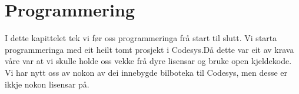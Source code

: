 \chapter{Programmering}
\thispagestyle{fancy}
I dette kapittelet tek vi før oss programmeringa frå start til slutt.
Vi starta programmeringa med eit heilt tomt prosjekt i \gls{Codesys}.Då dette var eit av krava våre var at vi skulle
holde oss vekke frå dyre lisensar og bruke open kjeldekode. Vi har nytt oss av nokon av dei innebygde bilboteka til 
\gls{Codesys}, men desse er ikkje nokon lisensar på.


